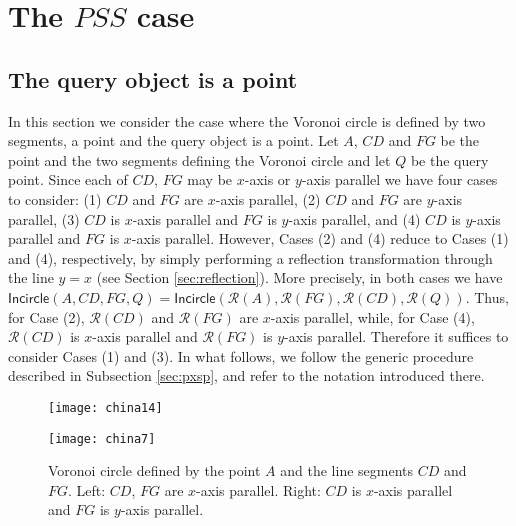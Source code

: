 \documentclass[letterpaper,11pt]{article}
\newcommand{\incircle}{\textsf{Incircle}\xspace}
\newcommand{\vor}{Voronoi\xspace}
\newcommand{\rfx}[1]{\mathcal{R}(#1)\xspace}
\newcommand{\pss}{$PSS$\xspace}
\begin{document}
\section{The \pss case}\label{sec:pss}

\subsection{The query object is a point}\label{sec:pssp}

In this section we consider the case where the \vor circle is defined
by two segments, a point and the query object is a point. Let $A$,
$CD$ and $FG$ be the point and the two segments defining the \vor
circle and let $Q$ be the query point. Since each of $CD$, $FG$ may be
$x$-axis or $y$-axis parallel we have four cases to consider:
(1) $CD$ and $FG$ are $x$-axis parallel,
(2) $CD$ and $FG$ are $y$-axis parallel,
(3) $CD$ is $x$-axis parallel and $FG$ is $y$-axis parallel, and
(4) $CD$ is $y$-axis parallel and $FG$ is $x$-axis parallel.
However, Cases (2) and (4) reduce to Cases (1) and (4), respectively,
by simply performing a reflection transformation through the line
$y=x$ (see Section \ref{sec:reflection}). More precisely, in both
cases we have
$\incircle(A,CD,FG,Q)=\incircle(\rfx{A},\rfx{FG},\rfx{CD},\rfx{Q})$. Thus,
for Case (2), $\rfx{CD}$ and $\rfx{FG}$ are $x$-axis parallel, while,
for Case (4), $\rfx{CD}$ is $x$-axis parallel and $\rfx{FG}$ is
$y$-axis parallel. Therefore it suffices to consider Cases (1) and (3).
In what follows, we follow the generic procedure described in
Subsection \ref{sec:pxsp}, and refer to the notation introduced
there.

\begin{figure}[t]
  \begin{center}
    \begin{minipage}{0.442\textwidth}
\hspace*{1mm}\texttt{[image: china14]}\vspace*{2mm}
    \end{minipage}\begin{minipage}{0.44\textwidth}
\hspace*{5mm}\texttt{[image: china7]}
    \end{minipage}
  \end{center}
  \caption{Voronoi circle defined by the point $A$ and the line
    segments $CD$ and $FG$. Left: $CD$, $FG$ are $x$-axis
    parallel. Right: $CD$ is $x$-axis parallel and $FG$ is $y$-axis
    parallel.}
  \label{fig:pss}
\end{figure}  
\end{document}
